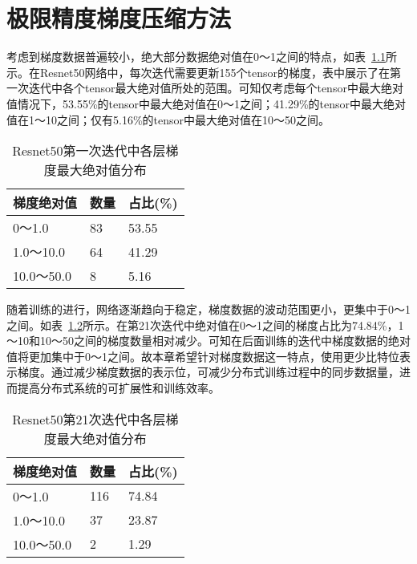\chapter{极限精度梯度压缩方法}
考虑到梯度数据普遍较小，绝大部分数据绝对值在0～1之间的特点，如表~\ref{tab:resnet50_1iter_grad_fabs}所示。在Resnet50网络中，每次迭代需要更新155个tensor的梯度，表中展示了在第一次迭代中各个tensor最大绝对值所处的范围。可知仅考虑每个tensor中最大绝对值情况下，53.55\%的tensor中最大绝对值在0～1之间；41.29\%的tensor中最大绝对值在1～10之间；仅有5.16\%的tensor中最大绝对值在10～50之间。
\begin{table}[htb]
\centering
\noindent\begin{minipage}{0.65\textwidth}
\centering
\caption{Resnet50第一次迭代中各层梯度最大绝对值分布}
\label{tab:resnet50_1iter_grad_fabs}
\begin{tabular}{p{2.5cm}p{2.5cm}p{2.5cm}}
\toprule[1.5pt]
梯度绝对值 & 数量 & 占比(\%) \\\midrule[1pt]
0～1.0 & 83 & 53.55\\
1.0～10.0 & 64 & 41.29\\
10.0～50.0 & 8 & 5.16\\
\midrule[1pt]
\end{tabular}
\end{minipage}
\end{table}

随着训练的进行，网络逐渐趋向于稳定，梯度数据的波动范围更小，更集中于0～1之间。如表~\ref{tab:resnet50_21iter_grad_fabs}所示。在第21次迭代中绝对值在0～1之间的梯度占比为74.84\%，1～10和10～50之间的梯度数量相对减少。可知在后面训练的迭代中梯度数据的绝对值将更加集中于0～1之间。故本章希望针对梯度数据这一特点，使用更少比特位表示梯度。通过减少梯度数据的表示位，可减少分布式训练过程中的同步数据量，进而提高分布式系统的可扩展性和训练效率。
\begin{table}[htb]
\centering
\noindent\begin{minipage}{0.65\textwidth}
\centering
\caption{Resnet50第21次迭代中各层梯度最大绝对值分布}
\label{tab:resnet50_21iter_grad_fabs}
\begin{tabular}{p{2.5cm}p{2.5cm}p{2.5cm}}
\toprule[1.5pt]
梯度绝对值 & 数量 & 占比(\%) \\\midrule[1pt]
0～1.0 & 116 & 74.84\\
1.0～10.0 & 37 & 23.87\\
10.0～50.0 & 2 & 1.29\\
\midrule[1pt]
\end{tabular}
\end{minipage}
\end{table}

